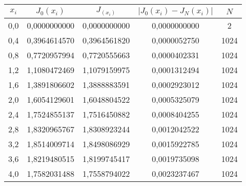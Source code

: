 \documentclass[a4paper,12pt]{article}
\begin{document}
{\begin{enumerate}[label = \arabic*.]
{\begin{table}[h]
          \centering
          \begin{tabular}{|c|c|c|c|c|}
            \hline
            $x_i$ & $J_0(x_i)$ & $J_(x_i)$ & $\left|J_0(x_i) - J_N(x_i)\right|$ & $N$\\
            \hline
            0,0 & 0,0000000000 & 0,0000000000 & 0,0000000000 & 2 \\
            \hline
            0,4 & 0,3964614570 & 0,3964561820 & 0,0000052750 & 1024 \\
            \hline
            0,8 & 0,7720957994 & 0,7720555663 & 0,0000402331 & 1024 \\
            \hline
            1,2 & 1,1080472469 & 1,1079159975 & 0,0001312494 & 1024 \\
            \hline
            1,6 & 1,3891806602 & 1,3888883591 & 0,0002923012 & 1024 \\
            \hline
            2,0 & 1,6054129601 & 1,6048804522 & 0,0005325079 & 1024 \\
            \hline
            2,4 & 1,7524855137 & 1,7516450882 & 0,0008404255 & 1024 \\
            \hline
            2,8 & 1,8320965767 & 1,8308923244 & 0,0012042522 & 1024 \\
            \hline
            3,2 & 1,8514009714 & 1,8498086929 & 0,0015922785 & 1024 \\
            \hline
            3,6 & 1,8219480515 & 1,8199745417 & 0,0019735098 & 1024 \\
            \hline
            4,0 & 1,7582031488 & 1,7558794022 & 0,0023237467 & 1024 \\
            \hline


\end{tabular}
\end{table}}
\end{enumerate}}
\end{document}
